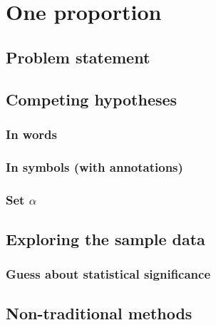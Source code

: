 \documentclass[12pt, krantz2,]{krantz}
\begin{document}
\hypertarget{one-proportion}{%
\section{One proportion}\label{one-proportion}}

\hypertarget{problem-statement-1}{%
\subsection{Problem statement}\label{problem-statement-1}}

\hypertarget{competing-hypotheses-1}{%
\subsection{Competing hypotheses}\label{competing-hypotheses-1}}

\hypertarget{in-words-1}{%
\subsubsection*{In words}\label{in-words-1}}


\hypertarget{in-symbols-with-annotations-1}{%
\subsubsection*{In symbols (with annotations)}\label{in-symbols-with-annotations-1}}


\hypertarget{set-alpha-1}{%
\subsubsection*{\texorpdfstring{Set \(\alpha\)}{Set \textbackslash{}alpha}}\label{set-alpha-1}}


\hypertarget{exploring-the-sample-data-1}{%
\subsection{Exploring the sample data}\label{exploring-the-sample-data-1}}

\hypertarget{guess-about-statistical-significance-1}{%
\subsubsection*{Guess about statistical significance}\label{guess-about-statistical-significance-1}}


\hypertarget{non-traditional-methods-1}{%
\subsection{Non-traditional methods}\label{non-traditional-methods-1}}
\end{document}

